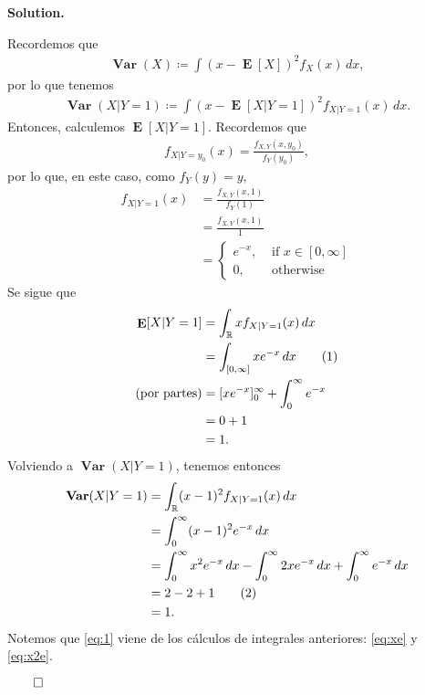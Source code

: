 \documentclass{article}
\newcommand\numberthis{\addtocounter{equation}{1}\tag{\theequation}}
\theoremstyle{problemstyle}
\newenvironment{solution}{%
  \begin{mdframed}[linewidth=0.8pt,linecolor=Gray,backgroundcolor=Gray!5,roundcorner=5pt]%
  \noindent\textbf{Solution.}%
}{%
\hfill $ \qed $ 
  \end{mdframed}%
}
\newcommand{\R}{\mathbb R}
\DeclareMathOperator{\Var}{\mathbf{Var}}
\DeclareMathOperator{\E}{\mathbf{E}}
\begin{document}
\begin{solution}
	Recordemos que
	\begin{align*}
		\Var(X) \coloneqq \int(x-\E[X])^2f_{X}(x)\,dx,
	\end{align*}
	por lo que tenemos
	\begin{align*}
		\Var(X|Y=1) \coloneqq \int(x-\E[X|Y=1])^2f_{X|Y=1}(x)\,dx.
	\end{align*}
	Entonces, calculemos $ \E[X|Y=1] $. Recordemos que
	\begin{align*}
		f_{X|Y=y_0}(x) = \frac{f_{X,Y}(x,y_0)}{f_Y(y_0)},
	\end{align*}
	por lo que, en este caso, como $ f_Y(y) = y $,
	\begin{align*}
		f_{X|Y=1}(x) & = \frac{f_{X,Y}(x,1)}{f_Y(1)}          \\
		             & = \frac{f_{X,Y}(x,1)}{1}               \\
		             & =\begin{cases}
			                e^{-x}, & \text{ if } x\in [0,\infty] \\
			                0,      & \text{ otherwise}
		                \end{cases}
	\end{align*}
	Se sigue que
	\begin{align*}
		\E[X|Y=1]           & = \int_{\R} x f_{X|Y=1}(x)\,dx                    \\
                        & = \int_{[0,\infty]} x e^{-x}\,dx\numberthis\label{eq:xe}                  \\
		(\text{por partes}) & = [xe^{-x}]_{0}^{\infty}+\int_{0}^{\infty} e^{-x} \\
		                    & = 0 + 1                                           \\
		                    & = 1.
	\end{align*}
	Volviendo a $ \Var(X|Y=1) $, tenemos entonces
	\begin{align*}
		\Var(X|Y=1) & = \int_{\R} (x-1)^2 f_{X|Y=1}(x)\,dx                                                                \\
		            & = \int_{0}^{\infty} (x-1)^2 e^{-x}\,dx                                                              \\
		            & = \int_{0}^{\infty} x^2 e^{-x}\,dx - \int_{0}^{\infty} 2x e^{-x}\,dx + \int_{0}^{\infty} e^{-x}\,dx \\
		            & = 2 - 2 + 1\numberthis\label{eq:1}                                                                  \\
		            & = 1.
	\end{align*}
  Notemos que \eqref{eq:1} viene de los c\'alculos de integrales anteriores: \eqref{eq:xe} y \eqref{eq:x2e}.


\end{solution}
\end{document}
